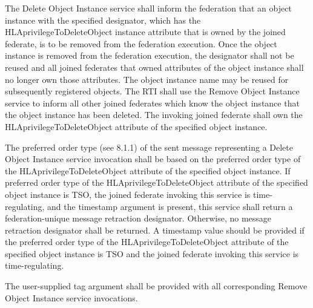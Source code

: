 \begin{compactstdpage}
    The Delete Object Instance service shall inform the federation that an object instance with the specified designator, which has the HLAprivilegeToDeleteObject instance attribute that is owned by the joined federate, is to be removed from the federation execution. Once the object instance is removed from the federation execution, the designator shall not be reused and all joined federates that owned attributes of the object instance shall no longer own those attributes. The object instance name may be reused for subsequently registered objects. The RTI shall use the Remove Object Instance \rtiinitiated{} service to inform all other joined federates which know the object instance that the object instance has been deleted. The invoking joined federate shall own the HLAprivilegeToDeleteObject attribute of the specified object instance.


    The preferred order type (see 8.1.1) of the sent message representing a Delete Object Instance service invocation shall be based on the preferred order type of the HLAprivilegeToDeleteObject attribute of the specified object instance. If preferred order type of the HLAprivilegeToDeleteObject attribute of the specified object instance is TSO, the joined federate invoking this service is time-regulating, and the timestamp argument is present, this service shall return a federation-unique message retraction designator. Otherwise, no message retraction designator shall be returned. A timestamp value should be provided if the preferred order type of the HLAprivilegeToDeleteObject attribute of the specified object instance is TSO and the joined federate invoking this service is time-regulating.


    The user-supplied tag argument shall be provided with all corresponding Remove Object Instance \rtiinitiated{} service invocations.

\end{compactstdpage}

\clearpage

